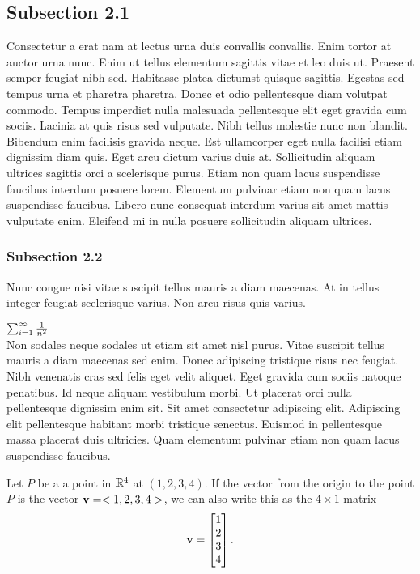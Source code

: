 \documentclass{article}
\begin{document}
\subsection{Subsection 2.1}

Consectetur a erat nam at lectus urna duis convallis convallis. Enim tortor at auctor urna nunc. Enim ut tellus elementum sagittis vitae et leo duis ut. Praesent semper feugiat nibh sed. Habitasse platea dictumst quisque sagittis. Egestas sed tempus urna et pharetra pharetra. Donec et odio pellentesque diam volutpat commodo. Tempus imperdiet nulla malesuada pellentesque elit eget gravida cum sociis. Lacinia at quis risus sed vulputate. Nibh tellus molestie nunc non blandit. Bibendum enim facilisis gravida neque. Est ullamcorper eget nulla facilisi etiam dignissim diam quis. Eget arcu dictum varius duis at. Sollicitudin aliquam ultrices sagittis orci a scelerisque purus. Etiam non quam lacus suspendisse faucibus interdum posuere lorem. Elementum pulvinar etiam non quam lacus suspendisse faucibus. Libero nunc consequat interdum varius sit amet mattis vulputate enim. Eleifend mi in nulla posuere sollicitudin aliquam ultrices.

\subsubsection{Subsection 2.2}

Nunc congue nisi vitae suscipit tellus mauris a diam maecenas. At in tellus integer feugiat scelerisque varius. Non arcu risus quis varius.


\begin{definition}{$\sum_{i=1}^{\infty} \frac{1}{n^2}$}\\
    Non sodales neque sodales ut etiam sit amet nisl purus. Vitae suscipit tellus mauris a diam maecenas sed enim. Donec adipiscing tristique risus nec feugiat. Nibh venenatis cras sed felis eget velit aliquet. Eget gravida cum sociis natoque penatibus. Id neque aliquam vestibulum morbi. Ut placerat orci nulla pellentesque dignissim enim sit. Sit amet consectetur adipiscing elit. Adipiscing elit pellentesque habitant morbi tristique senectus. Euismod in pellentesque massa placerat duis ultricies. Quam elementum pulvinar etiam non quam lacus suspendisse faucibus.  \cite{a_book}
\end{definition}

\begin{example}
Let $P$ be a a point in $\mathbb{R}^4$ at $(1,2,3,4)$.  If the vector from the origin to the point $P$ is the vector $\mathbf{v} = <1,2,3,4>$, we can also write this as the $4 \times 1$ matrix \[ \mathbf{v} =\begin{bmatrix}
1 \\
2\\
3\\
4\\
\end{bmatrix}.\]

\end{example}
\end{document}
